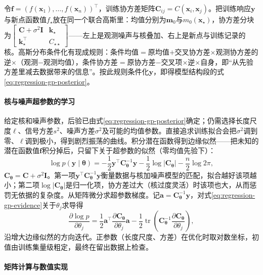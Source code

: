 令$\bm{f}=(f(\bm{x}_1),\ldots,f(\bm{x}_n))^{\top}$，训练协方差矩阵$\bm{C}_{ij}=C(\bm{x}_i,\bm{x}_j)$。把训练响应$\bm y$与新点函数值$f_\star$放在同一个联合高斯里：均值分别为$\bm m_0$与$m_0(\bm x_\star)$，协方差分块为$\begin{bmatrix}\bm C+\sigma^2\bm I & \bm k_\star\\ \bm k_\star^{\top} & C_{\star\star}\end{bmatrix}$——左上是观测噪声与核叠加、右上是新点与训练记录的核。高斯分布条件化有现成规则：条件均值$=$原均值$+$交叉协方差$\times$观测协方差的逆$\times$（观测$-$观测均值），条件协方差$=$原协方差$-$交叉项$\times$逆$\times$自身，即“从先验方差里减去数据带来的信息”。按此规则条件化$\bm y$，即得模型结构段的式\eqref{eq:regression-gp-posterior}。

\paragraph{核与噪声超参数的学习}

给定核和噪声参数，后验已由式\eqref{eq:regression-gp-posterior}确定；仍需选择长度尺度$\ell$、信号方差$s^2$、噪声方差$\sigma^2$及可能的均值参数。直接追求训练拟合会把$\sigma^2$调到零、$\ell$调到极小，得到剧烈振荡的曲线。积分潜在函数得到边缘似然——把未知的潜在函数值$\bm f$积分掉后，只留下关于超参数的似然（零均值先验下）：
\begin{equation}
  \log p(\bm{y}\mid\bm{\theta})
  =-\frac12\bm{y}^{\top}\bm{C}_{\bm{\theta}}^{-1}\bm{y}
    -\frac12\log|\bm{C}_{\bm{\theta}}|
    -\frac n2\log 2\pi,
  \label{eq:regression-gp-evidence}
\end{equation}
$\bm{C}_{\bm{\theta}}=\bm{C}+\sigma^2\bm{I}$。第一项$\bm{y}^{\top}\bm{C}_{\bm{\theta}}^{-1}\bm{y}$衡量数据与核加噪声模型的匹配，拟合越好该项越小；第二项$\log|\bm{C}_{\bm{\theta}}|$是归一化项，协方差过大（核过度灵活）时该项也大，从而惩罚无依据的复杂度。从矩阵微分求超参数梯度。记$\bm{a}=\bm{C}_{\bm{\theta}}^{-1}\bm{y}$，对式\eqref{eq:regression-gp-evidence}关于$\theta_j$求导得
\[
  \frac{\partial\log p}{\partial\theta_j}
  =\frac12\bm{a}^{\top}
    \frac{\partial\bm{C}_{\bm{\theta}}}{\partial\theta_j}\bm{a}
   -\frac12\operatorname{tr}\left(
     \bm{C}_{\bm{\theta}}^{-1}
     \frac{\partial\bm{C}_{\bm{\theta}}}{\partial\theta_j}
   \right),
\]
沿增大边缘似然的方向迭代。正参数（长度尺度、方差）在优化时取对数坐标，初值由训练集量级粗定，最终在留出数据上检查。

\paragraph{矩阵计算与数值实现}

